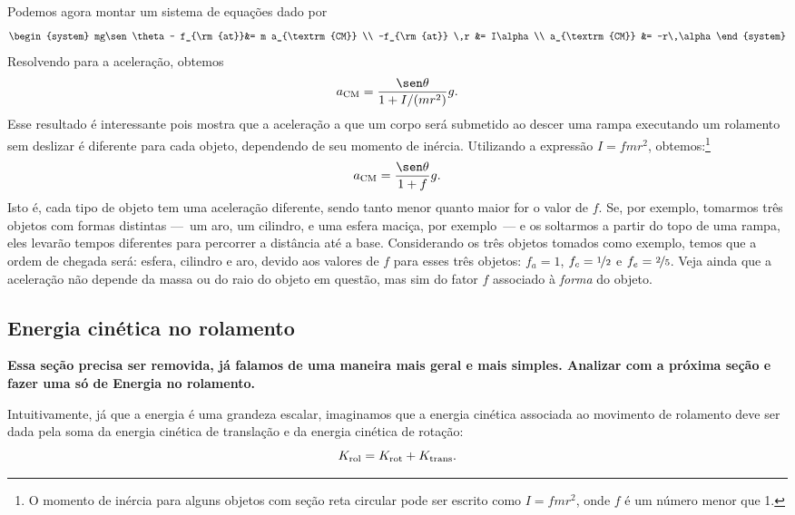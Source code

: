 Podemos agora montar um sistema de equações dado por
\begin{equation}
\begin{system}
    mg\sen\theta - f_{\rm{at}}&= m a_{\textrm{CM}} \\
    -f_{\rm{at}} \,r &= I\alpha \\
    a_{\textrm{CM}} &= -r\,\alpha
\end{system}
\end{equation}
%
Resolvendo para a aceleração, obtemos
\begin{equation}
  a_{\textrm{CM}} = \frac{\sen\theta}{1+I/(mr^2)} g.
\end{equation}
%
Esse resultado é interessante pois mostra que a aceleração a que um corpo será submetido ao descer uma rampa executando um rolamento sem deslizar é diferente para cada objeto, dependendo de seu momento de inércia. Utilizando a expressão $I = f mr^2$, obtemos:\footnote{O momento de inércia para alguns objetos com seção reta circular pode ser escrito como $I = f mr^2$, onde $f$ é um número menor que 1.}
\begin{equation}
  a_{\textrm{CM}} = \frac{\sen\theta}{1+f} g.
\end{equation}
%
Isto é, cada tipo de objeto tem uma aceleração diferente, sendo tanto menor quanto maior for o valor de $f$. Se, por exemplo, tomarmos três objetos com formas distintas ---~um aro, um cilindro, e uma esfera maciça, por exemplo~--- e os soltarmos a partir do topo de uma rampa, eles levarão tempos diferentes para percorrer a distância até a base. Considerando os três objetos tomados como exemplo, temos que a ordem de chegada será: esfera, cilindro e aro, devido aos valores de $f$ para esses três objetos: $f_a = 1$, $f_c = \nicefrac{1}{2}$ e $f_e = \nicefrac{2}{5}$. Veja ainda que a aceleração não depende da massa ou do raio do objeto em questão, mas sim do fator $f$ associado à \emph{forma} do objeto.

\subsection{Energia cinética no rolamento}

\textbf{Essa seção precisa ser removida, já falamos de uma maneira mais geral e mais simples. Analizar com a próxima seção e fazer uma só de Energia no rolamento.}

Intuitivamente, já que a energia é uma grandeza escalar, imaginamos que a energia cinética associada ao movimento de rolamento deve ser dada pela soma da energia cinética de translação e da energia cinética de rotação:
\begin{equation}
    K_{\rm{rol}} = K_{\rm{rot}} + K_{\rm{trans}}.
\end{equation}

